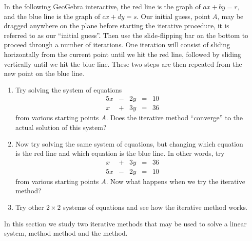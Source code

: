 \documentclass{ximera}
\begin{document}
\begin{exploration}\label{exp:gauss-seidel2x2}
In the following GeoGebra interactive, the red line is the graph of $ax+by=r$, and the blue line is the graph of $cx+dy=s$.  Our initial guess, point $A$, may be dragged anywhere on the plane before starting the iterative procedure, it is referred to as our ``initial guess''.  Then use the slide-flipping bar on the bottom to proceed through a number of iterations.  One iteration will consist of sliding horizontally from the current point until we hit the red line, followed by sliding vertically until we hit the blue line.  These two steps are then repeated from the new point on the blue line.
    
    \begin{enumerate}
        \item Try solving the system of equations
\begin{equation*}\label{eq:diagdom1}
\begin{array}{ccccc}
      5x& -&2y&=&10\\
      x & +&3y&= &36 
    \end{array}
\end{equation*}
from various starting points $A$.  Does the iterative method ``converge'' to the actual solution of this system?
        \item Now try solving the same system of equations, but changing which equation is the red line and which equation is the blue line.  In other words, try
\begin{equation*}\label{eq:diagdom2}
\begin{array}{ccccc}
      x & +&3y&= &36  \\
     5x& -&2y&=&10
    \end{array}
\end{equation*}
from various starting points $A$.  Now what happens when we try the iterative method?
\item Try other $2 \times 2$ systems of equations and see how the iterative method works.
    \end{enumerate}

    \begin{center}
\end{center}
\end{exploration}


In this section we study two iterative methods that may be used to solve a linear system,  method  method and the  method.
\end{document}
